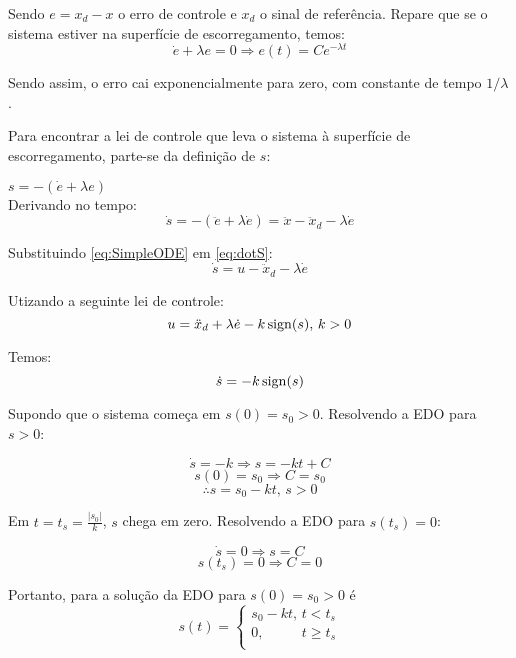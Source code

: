 Sendo $e = x_d - x$ o erro de controle e $x_d$ o sinal de refer\^encia. Repare que se o sistema estiver na superf\'icie de escorregamento, temos:
\begin{equation} \label{eq:SlidingError}
\dot{e} + \lambda e = 0 \Rightarrow e(t) = C e^{- \lambda t}
\end{equation}

Sendo assim, o erro cai exponencialmente para zero, com constante de tempo $1/\lambda$.

Para encontrar a lei de controle que leva o sistema \`a superf\'icie de escorregamento, parte-se da defini\c{c}\~ao de $s$:

$ s = -(\dot{e} + \lambda e) $ \\

Derivando no tempo:
\begin{equation} \label{eq:dotS}
\dot{s} =  -(\ddot{e} + \lambda \dot{e}) = \ddot{x} - \ddot{x}_d - \lambda \dot{e} 
\end{equation}

Substituindo \eqref{eq:SimpleODE} em \eqref{eq:dotS}:
\begin{equation} \label{dotS2}
\dot{s} = u - \ddot{x}_d - \lambda \dot{e}
\end{equation}

Utizando a seguinte lei de controle:
\begin{equation} \label{SMControlLaw1D}
u = \ddot{x}_d + \lambda \dot{e} - k \operatorname*{sign} (s), \, k>0
\end{equation}

Temos:
\begin{equation} \label{CloserLoop1D}
\dot{s} = -k \operatorname*{sign}(s) 
\end{equation}

Supondo que o sistema come\c{c}a em $s(0) = s_0 >0$. Resolvendo a EDO para $s>0$:

$$ \dot{s} = -k \Rightarrow s = -k t + C $$
$$ s(0) = s_0 \Rightarrow C = s_0 $$
$$ \therefore s = s_0 - k t, \, s>0 $$

Em $t = t_s = \frac{|s_0|}{k}$, $s$ chega em zero. Resolvendo a EDO para $s(t_s) = 0$:

$$ \dot{s} = 0 \Rightarrow s =  C $$
$$ s(t_s) = 0 \Rightarrow C = 0 $$

Portanto, para a solu\c{c}\~ao da EDO para $s(0) = s_0 > 0$ é
\begin{equation} \label{eq:SM-ODE-Sol1}
s(t) =
\begin{cases}
s_0 - k t, \, t < t_s \\
0, \,\,\,\,\,\,\,\,\,\,\,\,\,\,\,\, t \geq t_s \\
\end{cases}
\end{equation}

